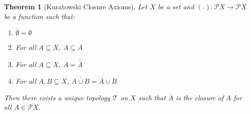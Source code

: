 \documentclass{report}
\newtheorem{thm}[lm]{Theorem}
\theoremstyle{definition}
\begin{document}
  \begin{thm}[Kuratowski Closure Axioms]
    Let $X$ be a set and $(\overline{\ }) : \mathcal{P} X \rightarrow
    \mathcal{P} X$ be a function such that:
    \begin{enumerate}
      \item $\overline{\emptyset} = \emptyset$
      \item For all $A \subseteq X$, $A \subseteq \overline{A}$
      \item For all $A \subseteq X$, $\overline{A} = \overline{\overline{A}}$
      \item For all $A, B \subseteq X$, $\overline{A \cup B} = \overline{A}
      \cup
      \overline{B}$
    \end{enumerate}
    Then there exists a unique topology $\mathcal{T}$ on $X$ such that
    $\overline{A}$ is the closure of $A$ for all $A \in \mathcal{P} X$.
  \end{thm}
\end{document}

